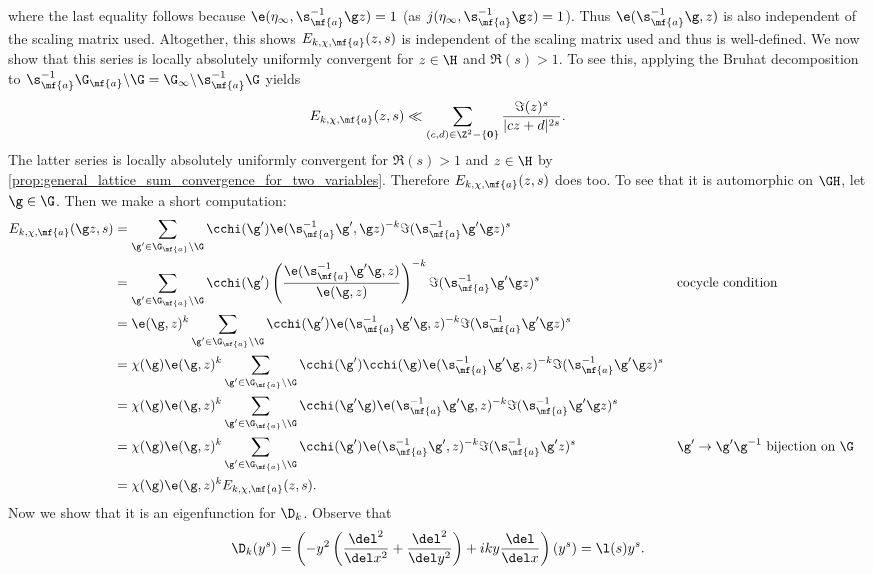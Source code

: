     where the last equality follows because $\e(\eta_{\infty},\s_{\mf{a}}^{-1}\g z) = 1$ (as $j(\eta_{\infty},\s_{\mf{a}}^{-1}\g z) = 1$). Thus $\e(\s_{\mf{a}}^{-1}\g,z)$ is also independent of the scaling matrix used. Altogether, this shows $E_{k,\chi,\mf{a}}(z,s)$ is independent of the scaling matrix used and thus is well-defined. We now show that this series is locally absolutely uniformly convergent for $z \in \H$ and $\Re(s) > 1$. To see this, applying the Bruhat decomposition to $\s_{\mf{a}}^{-1}\G_{\mf{a}}\backslash\G = \G_{\infty}\backslash\s_{\mf{a}}^{-1}\G$ yields
    \[
      E_{k,\chi,\mf{a}}(z,s) \ll \sum_{(c,d) \in \Z^{2}-\{\mathbf{0}\}}\frac{\Im(z)^{s}}{|cz+d|^{2s}}.
    \]
    The latter series is locally absolutely uniformly convergent for $\Re(s) > 1$ and $z \in \H$ by \cref{prop:general_lattice_sum_convergence_for_two_variables}. Therefore $E_{k,\chi,\mf{a}}(z,s)$ does too. To see that it is automorphic on $\GH$, let $\g \in \G$. Then we make a short computation:
    \begin{align*}
      E_{k,\chi,\mf{a}}(\g z,s) &= \sum_{\g' \in \G_{\mf{a}}\backslash\G}\cchi(\g')\e(\s_{\mf{a}}^{-1}\g',\g z)^{-k}\Im(\s_{\mf{a}}^{-1}\g'\g z)^{s} \\
      &= \sum_{\g' \in \G_{\mf{a}}\backslash\G}\cchi(\g')\left(\frac{\e(\s_{\mf{a}}^{-1}\g'\g,z)}{\e(\g,z)}\right)^{-k}\Im(\s_{\mf{a}}^{-1}\g'\g z)^{s} && \text{cocycle condition} \\
      &= \e(\g,z)^{k}\sum_{\g' \in \G_{\mf{a}}\backslash\G}\cchi(\g')\e(\s_{\mf{a}}^{-1}\g'\g,z)^{-k}\Im(\s_{\mf{a}}^{-1}\g'\g z)^{s} \\
      &= \chi(\g)\e(\g,z)^{k}\sum_{\g' \in \G_{\mf{a}}\backslash\G}\cchi(\g')\cchi(\g)\e(\s_{\mf{a}}^{-1}\g'\g,z)^{-k}\Im(\s_{\mf{a}}^{-1}\g'\g z)^{s} \\
      &= \chi(\g)\e(\g,z)^{k}\sum_{\g' \in \G_{\mf{a}}\backslash\G}\cchi(\g'\g)\e(\s_{\mf{a}}^{-1}\g'\g,z)^{-k}\Im(\s_{\mf{a}}^{-1}\g'\g z)^{s} \\
      &= \chi(\g)\e(\g,z)^{k}\sum_{\g' \in \G_{\mf{a}}\backslash\G}\cchi(\g')\e(\s_{\mf{a}}^{-1}\g',z)^{-k}\Im(\s_{\mf{a}}^{-1}\g' z)^{s} && \text{$\g' \to \g'\g^{-1}$ bijection on $\G$} \\
      &= \chi(\g)\e(\g,z)^{k}E_{k,\chi,\mf{a}}(z,s).
    \end{align*}
    Now we show that it is an eigenfunction for $\D_{k}$. Observe that
    \[
      \D_{k}(y^{s}) = \left(-y^{2}\left(\frac{\del^{2}}{\del x^{2}}+\frac{\del^{2}}{\del y^{2}}\right)+iky\frac{\del}{\del x}\right)(y^{s}) = \l(s)y^{s}.
    \]
